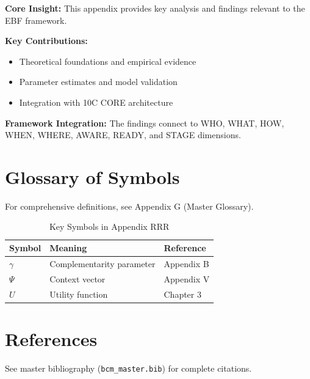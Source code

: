 \begin{tcolorbox}[colback=gray!5!white, colframe=gray!75!black,
    title=Appendix RRR Summary]

\textbf{Core Insight:}
This appendix provides key analysis and findings relevant to the EBF framework.

\textbf{Key Contributions:}
\begin{itemize}[nosep]
    \item Theoretical foundations and empirical evidence
    \item Parameter estimates and model validation
    \item Integration with 10C CORE architecture
\end{itemize}

\textbf{Framework Integration:}
The findings connect to WHO, WHAT, HOW, WHEN, WHERE, AWARE, READY, and STAGE dimensions.

\end{tcolorbox}

\section{Glossary of Symbols}
\label{sec:rrr-glossary}

For comprehensive definitions, see Appendix G (Master Glossary).

\begin{table}[htbp]
\centering
\caption{Key Symbols in Appendix RRR}
\begin{tabular}{lll}
\toprule
\textbf{Symbol} & \textbf{Meaning} & \textbf{Reference} \\
\midrule
$\gamma$ & Complementarity parameter & Appendix B \\
$\Psi$ & Context vector & Appendix V \\
$U$ & Utility function & Chapter 3 \\
\bottomrule
\end{tabular}
\end{table}


\section{References}
\label{sec:references}

See master bibliography (\texttt{bcm\_master.bib}) for complete citations.

\nocite{bcm_master}


